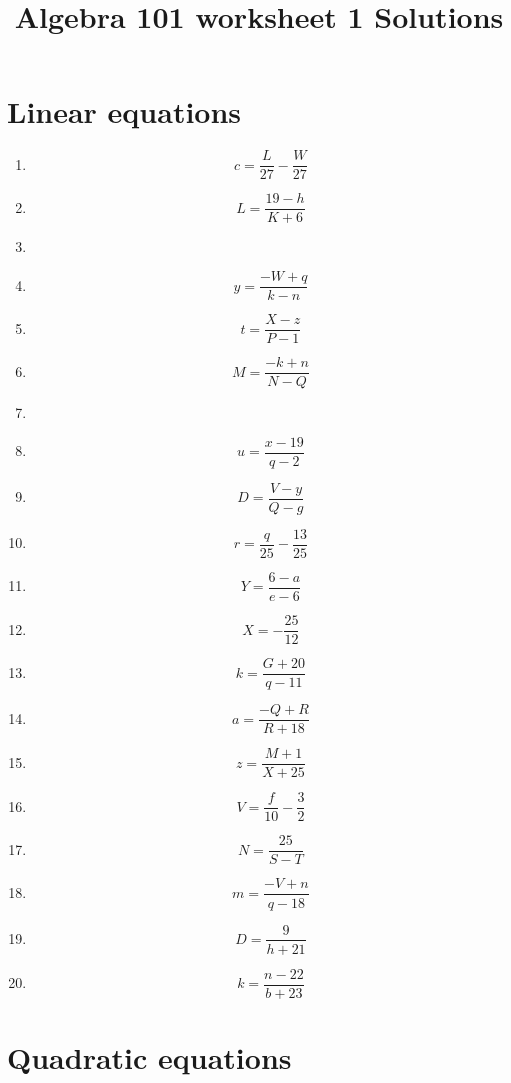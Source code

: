 \documentclass{article}
\begin{document}
    \title{Algebra 101 worksheet 1 Solutions}
    
    \date{\vspace{-5ex}}  
    
    \maketitle

        \section{Linear equations}
        
        \begin{enumerate}
        \item$$c =\frac{L}{27} - \frac{W}{27}$$
\item$$L =\frac{19 - h}{K + 6}$$
\item
\item$$y =\frac{- W + q}{k - n}$$
\item$$t =\frac{X - z}{P - 1}$$
\item$$M =\frac{- k + n}{N - Q}$$
\item
\item$$u =\frac{x - 19}{q - 2}$$
\item$$D =\frac{V - y}{Q - g}$$
\item$$r =\frac{q}{25} - \frac{13}{25}$$
\item$$Y =\frac{6 - a}{e - 6}$$
\item$$X =- \frac{25}{12}$$
\item$$k =\frac{G + 20}{q - 11}$$
\item$$a =\frac{- Q + R}{R + 18}$$
\item$$z =\frac{M + 1}{X + 25}$$
\item$$V =\frac{f}{10} - \frac{3}{2}$$
\item$$N =\frac{25}{S - T}$$
\item$$m =\frac{- V + n}{q - 18}$$
\item$$D =\frac{9}{h + 21}$$
\item$$k =\frac{n - 22}{b + 23}$$
        \end{enumerate}
        

        \section{Quadratic equations}
        
\end{document}
